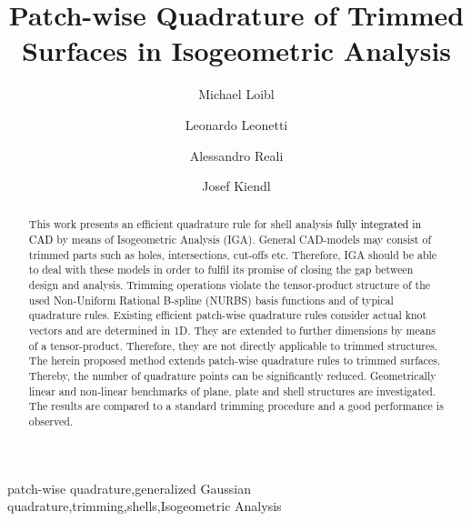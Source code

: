 \documentclass[3p]{elsarticle}
\newcommand{\reviewed}{\textcolor{black}}	%
\begin{document}
\nolinenumbers

\begin{frontmatter}

\title{Patch-wise Quadrature of Trimmed Surfaces in Isogeometric Analysis}

\author[1]{Michael Loibl}
\author[2]{Leonardo Leonetti}
\author[3]{Alessandro Reali}
\author[1]{Josef Kiendl}
\address[1]{Institute of Engineering Mechanics and Structural Analysis, Universität der Bundeswehr München, Werner-Heisenberg-Weg 39, 85577 Neubiberg, Germany}
\address[2]{Dipartimento di Ingegneria Informatica, Modellistica, Elettronica e Sistemistica, Università della Calabria, Italy}
\address[3]{Department of Civil Engineering and Architecture, University of Pavia, Italy}


\begin{abstract}
This work presents an efficient quadrature rule for shell analysis \reviewed{fully integrated in CAD} by means of Isogeometric Analysis (IGA). General CAD-models may consist of trimmed parts such as holes, intersections, cut-offs etc. Therefore, IGA should be able to deal with these models in order to fulfil its promise of closing the gap between design and analysis. Trimming operations violate the tensor-product structure of the used Non-Uniform Rational B-spline (NURBS) basis functions and of typical quadrature rules. Existing efficient patch-wise quadrature rules consider actual knot vectors and are determined in 1D. They are extended to further dimensions by means of a tensor-product. Therefore, they are not directly applicable to trimmed structures. The herein proposed method extends patch-wise quadrature rules to trimmed surfaces. Thereby, the number of quadrature points can be significantly reduced. Geometrically linear and non-linear benchmarks of plane, plate and shell structures are investigated. The results are compared to a standard trimming procedure and a good performance is observed.
\end{abstract}

\begin{keyword}
patch-wise quadrature\sep generalized Gaussian quadrature\sep trimming\sep shells\sep Isogeometric Analysis
\end{keyword}

\end{frontmatter}
\end{document}
